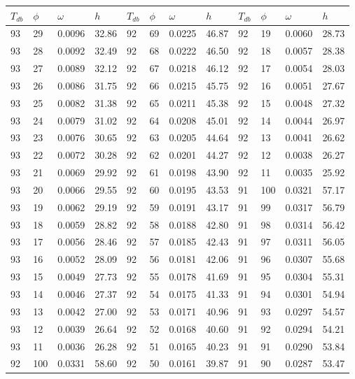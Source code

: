 \begin{tabular}{llll|llll|llll}
 \toprule 
\(T_{db}\) & \(\phi\) & \(\omega\) & \(h\) & \(T_{db}\) & \(\phi\) & \(\omega\) & \(h\) & \(T_{db}\) & \(\phi\) & \(\omega\) & \(h\)  \\ \midrule 
93 & 29 & 0.0096 & 32.86 & 92 & 69 & 0.0225 & 46.87 & 92 & 19 & 0.0060 & 28.73\\
93 & 28 & 0.0092 & 32.49 & 92 & 68 & 0.0222 & 46.50 & 92 & 18 & 0.0057 & 28.38\\
93 & 27 & 0.0089 & 32.12 & 92 & 67 & 0.0218 & 46.12 & 92 & 17 & 0.0054 & 28.03\\
93 & 26 & 0.0086 & 31.75 & 92 & 66 & 0.0215 & 45.75 & 92 & 16 & 0.0051 & 27.67\\
93 & 25 & 0.0082 & 31.38 & 92 & 65 & 0.0211 & 45.38 & 92 & 15 & 0.0048 & 27.32\\
93 & 24 & 0.0079 & 31.02 & 92 & 64 & 0.0208 & 45.01 & 92 & 14 & 0.0044 & 26.97\\
93 & 23 & 0.0076 & 30.65 & 92 & 63 & 0.0205 & 44.64 & 92 & 13 & 0.0041 & 26.62\\
93 & 22 & 0.0072 & 30.28 & 92 & 62 & 0.0201 & 44.27 & 92 & 12 & 0.0038 & 26.27\\
93 & 21 & 0.0069 & 29.92 & 92 & 61 & 0.0198 & 43.90 & 92 & 11 & 0.0035 & 25.92\\
93 & 20 & 0.0066 & 29.55 & 92 & 60 & 0.0195 & 43.53 & 91 & 100 & 0.0321 & 57.17\\
93 & 19 & 0.0062 & 29.19 & 92 & 59 & 0.0191 & 43.17 & 91 & 99 & 0.0317 & 56.79\\
93 & 18 & 0.0059 & 28.82 & 92 & 58 & 0.0188 & 42.80 & 91 & 98 & 0.0314 & 56.42\\
93 & 17 & 0.0056 & 28.46 & 92 & 57 & 0.0185 & 42.43 & 91 & 97 & 0.0311 & 56.05\\
93 & 16 & 0.0052 & 28.09 & 92 & 56 & 0.0181 & 42.06 & 91 & 96 & 0.0307 & 55.68\\
93 & 15 & 0.0049 & 27.73 & 92 & 55 & 0.0178 & 41.69 & 91 & 95 & 0.0304 & 55.31\\
93 & 14 & 0.0046 & 27.37 & 92 & 54 & 0.0175 & 41.33 & 91 & 94 & 0.0301 & 54.94\\
93 & 13 & 0.0042 & 27.00 & 92 & 53 & 0.0171 & 40.96 & 91 & 93 & 0.0297 & 54.57\\
93 & 12 & 0.0039 & 26.64 & 92 & 52 & 0.0168 & 40.60 & 91 & 92 & 0.0294 & 54.21\\
93 & 11 & 0.0036 & 26.28 & 92 & 51 & 0.0165 & 40.23 & 91 & 91 & 0.0290 & 53.84\\
92 & 100 & 0.0331 & 58.60 & 92 & 50 & 0.0161 & 39.87 & 91 & 90 & 0.0287 & 53.47\\

\end{tabular}
